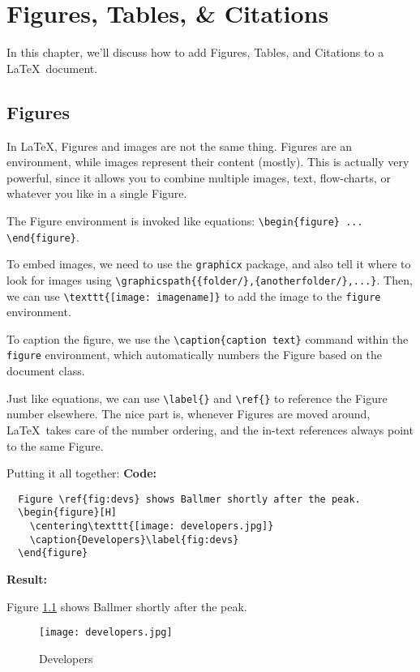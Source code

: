 \chapter{Figures, Tables, \& Citations}
In this chapter, we'll discuss how to add Figures, Tables, and Citations to a \LaTeX\ document.
\section{Figures}
In \LaTeX, Figures and images are not the same thing.
Figures are an environment, while images represent their content (mostly).
This is actually very powerful,
since it allows you to combine multiple images, text, flow-charts, or whatever you like
in a single Figure.
\par
The Figure environment is invoked like equations: \lstinline|\begin{figure} ... \end{figure}|.
\par
To embed images, we need to use the \lstinline|graphicx| package,
and also tell it where to look for images using \lstinline|\graphicspath{{folder/},{anotherfolder/},...}|.
Then, we can use \lstinline|\texttt{[image: imagename]}| to add the image to the \lstinline|figure| environment.
\par
To caption the figure, we use the \lstinline|\caption{caption text}| command within the \lstinline|figure| environment,
which automatically numbers the Figure based on the document class.
\par
Just like equations, we can use \lstinline|\label{}| and \lstinline|\ref{}| to reference the Figure number elsewhere.
The nice part is, whenever Figures are moved around, \LaTeX\ takes care of the number ordering,
and the in-text references always point to the same Figure.
\par
Putting it all together:\clearpage
\textbf{Code:}
\begin{lstlisting}
  Figure \ref{fig:devs} shows Ballmer shortly after the peak.
  \begin{figure}[H]
    \centering\texttt{[image: developers.jpg]}
    \caption{Developers}\label{fig:devs}
  \end{figure}
\end{lstlisting}
\textbf{Result:}
\par
Figure \ref{fig:devs} shows Ballmer shortly after the peak.
\begin{figure}[H]
  \centering\texttt{[image: developers.jpg]}
  \caption{Developers}\label{fig:devs}
\end{figure}
